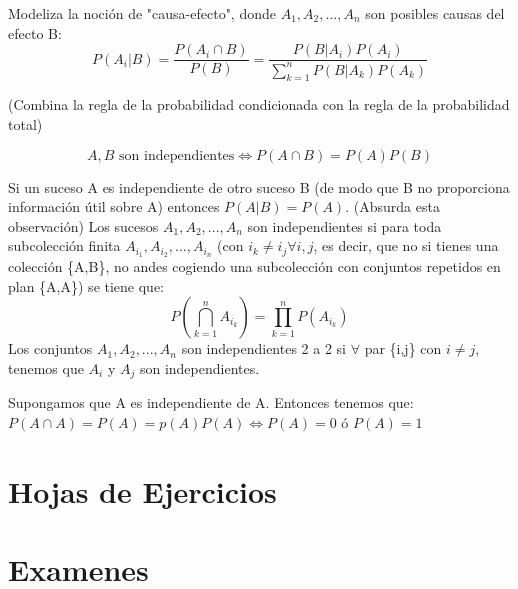 \documentclass{apuntes}
\begin{document}
\begin{defn}
Modeliza la noción de "causa-efecto", donde $A_1, A_2,...,A_n$ son posibles causas del efecto B:
\[
P(A_i|B)= \frac{P(A_i\cap B)}{P(B)}= \frac{P(B|A_i)P(A_i)}{\sum_{k=1}^{n}P(B|A_k)P(A_k)}
\]

(Combina la regla de la probabilidad condicionada con la regla de la probabilidad total)
\end{defn}

\begin{defn}[Independencia]
\[
A,B \text{ son independientes} \Leftrightarrow P(A \cap B)=P(A)P(B)
\]

\obs Si un suceso A es independiente de otro suceso B (de modo que B no proporciona información útil sobre A) entonces $P(A|B)=P(A)$.
\obs (Absurda esta observación) Los sucesos $A_1, A_2,...,A_n$ son independientes si para toda subcolección finita $A_{i_1},A_{i_2},...,A_{i_n}$ (con $i_k \neq i_j \forall i,j$, es decir, que no si tienes una colección \{A,B\}, no andes cogiendo una subcolección con conjuntos repetidos en plan \{A,A\}) se tiene que:
\[
P(\bigcap_{k=1}^{n}A_{i_k})=\prod_{k=1}^{n}P(A_{i_k})
\]
\obs Los conjuntos $A_1, A_2,...,A_n$ son independientes 2 a 2 si $\forall$ par \{i,j\} con $i \neq j$, tenemos que $A_i$ y $A_j$ son independientes.

\begin{example}
Supongamos que A es independiente de A. Entonces tenemos que: $P(A\cap A)=P(A)=p(A)P(A) \Leftrightarrow P(A)=0$ ó $P(A)=1$
\end{example}
\end{defn}










%



\chapter{Hojas de Ejercicios}


\chapter{Examenes}

\end{document}
